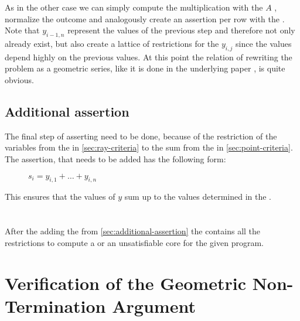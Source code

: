 As in the other case we can simply compute the multiplication with the \updatematrix $A$ , normalize the outcome and analogously create an assertion per row with the \smtfactory. \newline
Note that $y_{i-1,n}$ represent the values of the previous step and therefore not only already exist, but also create a lattice of restrictions for the $y_{i,j}$ since the values depend highly on the previous values. At this point the relation of rewriting the problem as a geometric series, like it is done in the underlying paper \cite{leike2014geometric}, is quite obvious.

\subsection{Additional assertion}
\label{sec:additional-assertion}
The final step of asserting need to be done, because of the restriction of the variables from the \rayc in \autoref{sec:ray-criteria} to the sum from the \pointc in \autoref{sec:point-criteria}.\newline
The assertion, that needs to be added has the following form:
\begin{figure}[H]
	\centering
	$s_i = y_{i,1}+ \dots + y_{i,n}$
\end{figure}
This ensures that the values of $y$ sum up to the values determined in the \pointc.
\\
\\
\\
After the adding the \addass from \autoref{sec:additional-assertion} the \solver contains all the restrictions to compute a \gna or an unsatisfiable core for the given program.

\section{Verification of the Geometric Non-Termination Argument}
\label{sec:verification-of-gna}
	 
